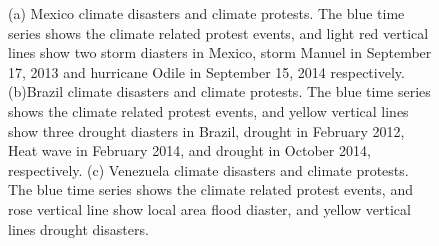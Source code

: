 \begin{figure}[t]
	\centering
	\caption{(a) Mexico climate disasters and climate protests. The blue time series shows the climate related protest events, and light red vertical lines show two storm diasters in Mexico, storm Manuel in September 17, 2013 and hurricane Odile in September 15, 2014 respectively. (b)Brazil climate disasters and climate protests. The blue time series shows the climate related protest events, and yellow vertical lines show three drought diasters in Brazil, drought in February 2012, Heat wave in February 2014, and drought in October 2014, respectively. (c) Venezuela climate disasters and climate protests. The blue time series shows the climate related protest events, and rose vertical line show local area flood diaster, and yellow vertical lines drought disasters.}
\label{climate-timeseries}
\end{figure}



